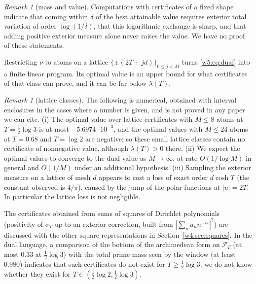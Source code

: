 \documentclass[11pt]{amsart}
\theoremstyle{definition}
\theoremstyle{remark}
\newtheorem{remark}[theorem]{Remark}
\numberwithin{equation}{section}
\newcommand{\PT}{\mathcal{P}_T}                        %
\newcommand{\sT}{\sigma_T}                             %
\newcommand{\lam}{\lambda(T)}                          %
\begin{document}
\begin{remark}[mass and value]\label{w5:obs:massvalue}
Computations with certificates of a fixed shape indicate that coming within $\delta$ of the best attainable value
requires exterior total variation of order $\log(1/\delta)$, that this logarithmic exchange is sharp, and that adding
positive exterior measure alone never raises the value. We have no proof of these statements.
\end{remark}

Restricting $\nu$ to atoms on a lattice $\{\pm(2T+jd)\}_{0\le j<M}$ turns \eqref{w5:eq:dual} into a finite linear
program. Its optimal value is an upper bound for what certificates of that class can prove, and it can be far below
$\lam$.

\begin{remark}[lattice classes]\label{w5:obs:ceil}
The following is numerical, obtained with interval enclosures in the cases where a number is given, and is not proved
in any paper we can cite. (i) The optimal value over lattice certificates with $M\le8$ atoms at $T=\frac12\log3$ is at
most $-5.6974\cdot10^{-3}$, and the optimal values with $M\le24$ atoms at $T=0.68$ and $T=\log 2$ are negative; so these
small lattice classes contain no certificate of nonnegative value, although $\lam>0$ there. (ii) We expect the optimal
values to converge to the dual value as $M\to\infty$, at rate $O(1/\log M)$ in general and $O(1/M)$ under an additional
hypothesis. (iii) Sampling the exterior measure on a lattice of mesh $d$ appears to cost a loss of exact order
$d\cosh T$ (the constant observed is $4/\pi$), caused by the jump of the polar functions at $|u|=2T$. In particular the
lattice loss is not negligible.
\end{remark}

The certificates obtained from sums of squares of Dirichlet polynomials (positivity of $\sT$ up to an exterior
correction, built from $|\sum_na_nn^{-i\tau}|^2$) are discussed with the other square representations in
Section~\ref{w4:sec:squares}. In the dual language, a comparison of the bottom of the archimedean form on $\PT$ (at most
$0.33$ at $\frac12\log3$) with the total prime mass seen by the window (at least $0.980$) indicates that such
certificates do not exist for $T\ge\frac12\log3$; we do not know whether they exist for
$T\in(\frac12\log2,\frac12\log3)$.
\end{document}
